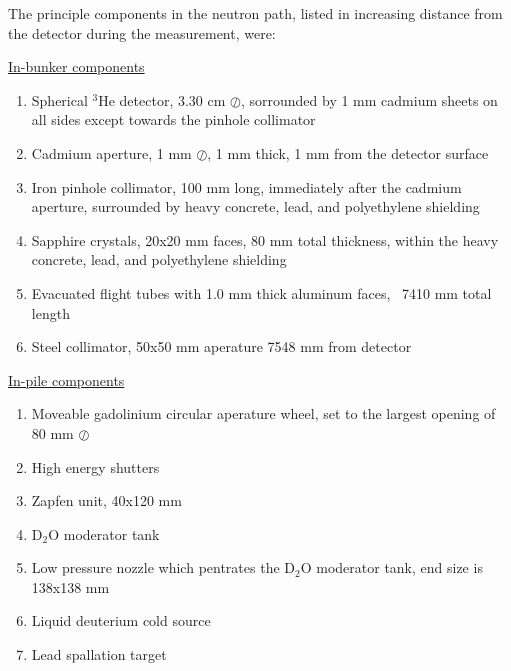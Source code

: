 \documentclass[5p,12pt]{elsarticle}
\begin{document}
The principle components in the neutron path, listed in increasing distance from the detector during the measurement, were:

\begin{center} \underline{In-bunker components}\end{center}
\begin{enumerate}
  \item Spherical $^3$He detector, 3.30 cm $\oslash$, sorrounded by 1 mm cadmium sheets on all sides except towards the pinhole collimator
  \item Cadmium aperture, 1 mm $\oslash$, 1 mm thick, 1 mm from the detector surface
  \item Iron pinhole collimator, 100 mm long, immediately after the cadmium aperture, surrounded by heavy concrete, lead, and polyethylene shielding
  \item Sapphire crystals, 20x20 mm faces, 80 mm total thickness, within the heavy concrete, lead, and polyethylene shielding
  \item Evacuated flight tubes with 1.0 mm thick aluminum faces, ~7410 mm total length 
  \item Steel collimator, 50x50 mm aperature 7548 mm from detector
\end{enumerate}
\begin{center}\underline{In-pile components}\end{center}
\begin{enumerate}[resume]
  \item Moveable gadolinium circular aperature wheel, set to the largest opening of 80 mm $\oslash$
  \item High energy shutters
  \item Zapfen unit, 40x120 mm
  \item D$_2$O moderator tank
  \item Low pressure nozzle which pentrates the D$_2$O moderator tank, end size is 138x138 mm
  \item Liquid deuterium cold source
  \item Lead spallation target
\end{enumerate}
\end{document}
